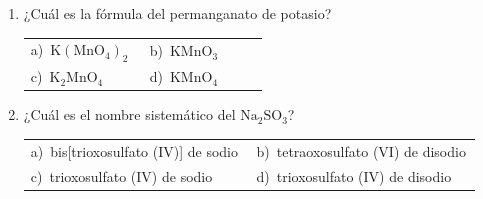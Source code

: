 \documentclass[11pt,a4paper]{article}
\begin{document}
\begin{enumerate}[label=\textbf{\arabic*.},leftmargin=*,itemsep=11pt,topsep=0pt]
\item \begin{minipage}[t]{\linewidth}
¿Cuál es la fórmula del permanganato de potasio?

\vspace{5pt}
\begin{tabular}{@{}p{0.47\linewidth}p{0.47\linewidth}@{}}
a)~$\mathrm{K(MnO_{4})_{2}}$ & b)~$\mathrm{KMnO_{3}}$ \\
c)~$\mathrm{K_{2}MnO_{4}}$ & d)~$\mathrm{KMnO_{4}}$ \\
\end{tabular}
\end{minipage}

\item \begin{minipage}[t]{\linewidth}
¿Cuál es el nombre sistemático del $\mathrm{Na_{2}SO_{3}}$?

\vspace{5pt}
\begin{tabular}{@{}p{0.47\linewidth}p{0.47\linewidth}@{}}
a)~bis[trioxosulfato (IV)] de sodio & b)~tetraoxosulfato (VI) de disodio \\
c)~trioxosulfato (IV) de sodio & d)~trioxosulfato (IV) de disodio \\
\end{tabular}
\end{minipage}

\end{enumerate}
\end{document}
